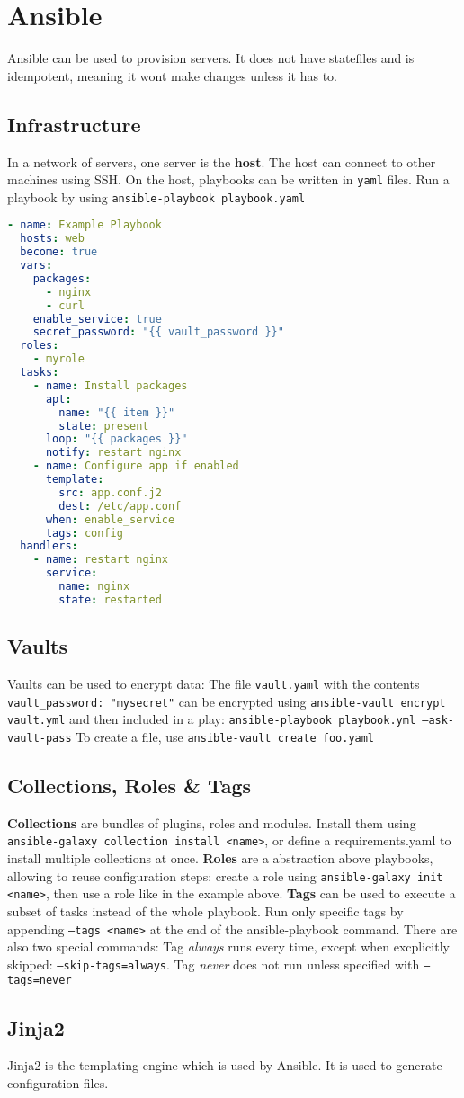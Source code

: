 \section{Ansible}
Ansible can be used to provision servers. It does not have statefiles and is idempotent, meaning it wont make changes unless it has to.
\subsection{Infrastructure}
In a network of servers, one server is the \textbf{host}. The host can connect to other machines using SSH. On the host, playbooks can be written in \texttt{yaml} files. Run a playbook by using \texttt{ansible-playbook playbook.yaml}

\begin{lstlisting}[language=yaml]
- name: Example Playbook
  hosts: web
  become: true
  vars:
    packages:
      - nginx
      - curl
    enable_service: true
    secret_password: "{{ vault_password }}"
  roles:
    - myrole
  tasks:
    - name: Install packages
      apt:
        name: "{{ item }}"
        state: present
      loop: "{{ packages }}"
      notify: restart nginx
    - name: Configure app if enabled
      template:
        src: app.conf.j2
        dest: /etc/app.conf
      when: enable_service
      tags: config
  handlers:
    - name: restart nginx
      service:
        name: nginx
        state: restarted
\end{lstlisting}
\subsection{Vaults}
Vaults can be used to encrypt data: The file \texttt{vault.yaml} with the contents \texttt{vault\string_password: "mysecret"} can be encrypted using \texttt{ansible-vault encrypt vault.yml} and then included in a play: \texttt{ansible-playbook playbook.yml --ask-vault-pass}
To create a file, use \texttt{ansible-vault create foo.yaml}
\subsection{Collections, Roles \& Tags}

\textbf{Collections} are bundles of plugins, roles and modules. Install them using \texttt{ansible-galaxy collection install <name>}, or define a requirements.yaml to install multiple collections at once.
\textbf{Roles} are a abstraction above playbooks, allowing to reuse configuration steps: create a role using \texttt{ansible-galaxy init <name>}, then use a role like in the example above.
\textbf{Tags} can be used to execute a subset of tasks instead of the whole playbook. Run only specific tags by appending \texttt{--tags <name>} at the end of the ansible-playbook command. There are also two special commands: Tag \textit{always} runs every time, except when excplicitly skipped: \texttt{--skip-tags=always}. Tag \textit{never} does not run unless specified with \texttt{--tags=never}
\subsection{Jinja2}
Jinja2 is the templating engine which is used by Ansible. It is used to generate configuration files.
